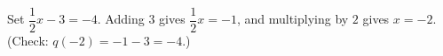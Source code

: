 Set $\dfrac{1}{2}x-3=-4$. Adding $3$ gives $\dfrac{1}{2}x=-1$, and multiplying by $2$ gives $x=\boxed{-2}$. (Check: $q(-2)=-1-3=-4$.)
